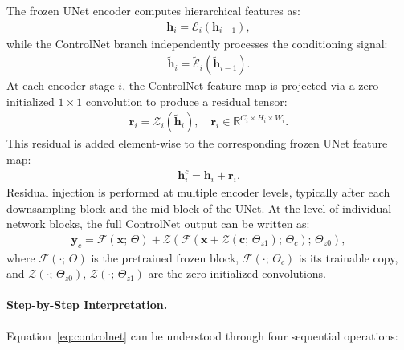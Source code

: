 The frozen UNet encoder computes hierarchical features as:
\begin{align}
    \mathbf{h}_i = \mathcal{E}_i(\mathbf{h}_{i-1}),
    \label{eq:unet_encoder}
\end{align}
while the ControlNet branch independently processes the conditioning signal:
\begin{align}
    \tilde{\mathbf{h}}_i = \tilde{\mathcal{E}}_i(\tilde{\mathbf{h}}_{i-1}).
    \label{eq:controlnet_encoder}
\end{align}
At each encoder stage $i$, the ControlNet feature map is projected via a zero-initialized $1 \times 1$ convolution to produce a residual tensor:
\begin{align}
    \mathbf{r}_i = \mathcal{Z}_i(\tilde{\mathbf{h}}_i), \quad \mathbf{r}_i \in \mathbb{R}^{C_i \times H_i \times W_i}.
    \label{eq:controlnet_residual}
\end{align}
This residual is added element-wise to the corresponding frozen UNet feature map:
\begin{align}
    \mathbf{h}_i^c = \mathbf{h}_i + \mathbf{r}_i.
    \label{eq:controlnet_injection}
\end{align}
Residual injection is performed at multiple encoder levels, typically after each downsampling block and the mid block of the UNet. At the level of individual network blocks, the full ControlNet output can be written as:
\begin{align}
    \mathbf{y}_c = \mathcal{F}(\mathbf{x};\, \Theta) + \mathcal{Z}\!\left(\mathcal{F}\!\left(\mathbf{x} + \mathcal{Z}(\mathbf{c};\, \Theta_{z1});\, \Theta_c\right);\, \Theta_{z0}\right),
    \label{eq:controlnet}
\end{align}
where $\mathcal{F}(\cdot;\,\Theta)$ is the pretrained frozen block, $\mathcal{F}(\cdot;\,\Theta_c)$ is its trainable copy, and $\mathcal{Z}(\cdot;\,\Theta_{z0})$, $\mathcal{Z}(\cdot;\,\Theta_{z1})$ are the zero-initialized convolutions.

\paragraph{Step-by-Step Interpretation.}
Equation~\eqref{eq:controlnet} can be understood through four sequential operations:

